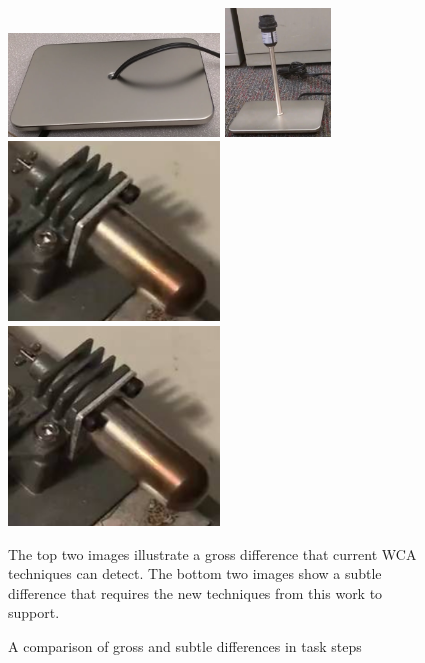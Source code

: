 \begin{figure}
  \includegraphics[width=0.5\textwidth]{figures/coarse_fine/lamp_base.png}
  \includegraphics[width=0.25\textwidth]{figures/coarse_fine/lamp_pipe.png}
  \includegraphics[width=0.5\textwidth]{figures/coarse_fine/stirling_1screw.png}
  \includegraphics[width=0.5\textwidth]{figures/coarse_fine/stirling_2screws.png}
  \begin{captiontext}
    The top two images illustrate a gross difference that current WCA techniques
    can detect.
    The bottom two images show a subtle difference that requires the new
    techniques from this work to support.
  \end{captiontext}
  \caption{
    A comparison of gross and subtle differences in task steps
  }\label{fig:subtle_gross}
\end{figure}


